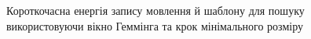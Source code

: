         \begin{figure}[!h]
            \centering

            \caption{Короткочасна енергія запису мовлення й шаблону для пошуку використовуючи вікно Геммінга та крок
                мінімального розміру}\label{fig:audio-energy-hamming-min}
        \end{figure}

